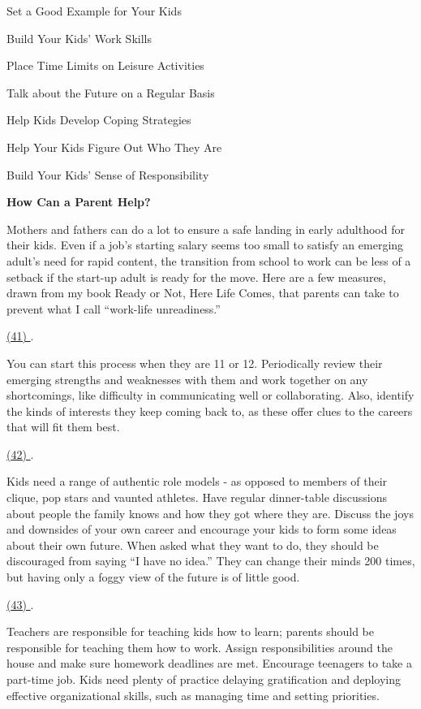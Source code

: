 \qquad [A] Set a Good Example for Your Kids

\qquad [B] Build Your Kids’ Work Skills

\qquad [C] Place Time Limits on Leisure Activities

\qquad [D] Talk about the Future on a Regular Basis

\qquad [E] Help Kids Develop Coping Strategies

\qquad [F] Help Your Kids Figure Out Who They Are

\qquad [G] Build Your Kids’ Sense of Responsibility

\begin{center}\textbf{How Can a Parent Help?}\end{center}

\qquad Mothers and fathers can do a lot to ensure a safe landing in early adulthood for their kids. Even if a job’s starting salary seems too small to satisfy an emerging adult’s need for rapid content, the transition from school to work can be less of a setback if the start-up adult is ready for the move. Here are a few measures, drawn from my book Ready or Not, Here Life Comes, that parents can take to prevent what I call “work-life unreadiness.”

\qquad \ul{(41) \qquad\qquad}.

\qquad You can start this process when they are 11 or 12. Periodically review their emerging strengths and weaknesses with them and work together on any shortcomings, like difficulty in communicating well or collaborating. Also, identify the kinds of interests they keep coming back to, as these offer clues to the careers that will fit them best.

\qquad \ul{(42) \qquad\qquad}.

\qquad Kids need a range of authentic role models - as opposed to members of their clique, pop stars and vaunted athletes. Have regular dinner-table discussions about people the family knows and how they got where they are. Discuss the joys and downsides of your own career and encourage your kids to form some ideas about their own future. When asked what they want to do, they should be discouraged from saying “I have no idea.” They can change their minds 200 times, but having only a foggy view of the future is of little good.

\qquad \ul{(43) \qquad\qquad}.

\qquad Teachers are responsible for teaching kids how to learn; parents should be responsible for teaching them how to work. Assign responsibilities around the house and make sure homework deadlines are met. Encourage teenagers to take a part-time job. Kids need plenty of practice delaying gratification and deploying effective organizational skills, such as managing time and setting priorities.

